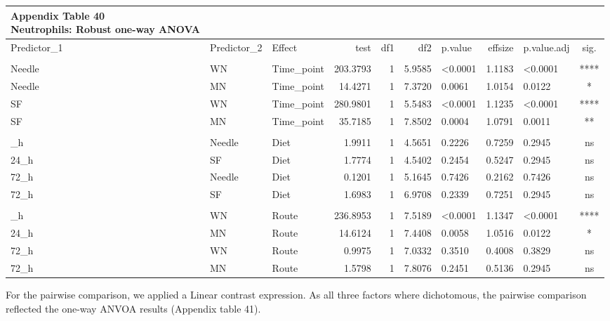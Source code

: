 \documentclass[
  12pt,
  letterpaper,
]{article}
\begin{document}
\begingroup
\fontsize{12.0pt}{14.4pt}\selectfont
\begin{longtable}{lllrrrlrlc}
\caption*{
{\large \textbf{Appendix Table 40}} \\ 
{\small \textbf{Neutrophils: Robust one-way ANOVA}}
} \\ 
\toprule
Predictor\_1 & Predictor\_2 & {Effect} & {test} & {df1} & {df2} & {p.value} & {effsize} & {p.value.adj} & {sig.} \\ 
\midrule\addlinespace[2.5pt]
\multicolumn{10}{l}{Predictor: Time\_point} \\[2.5pt] 
\midrule\addlinespace[2.5pt]
Needle & WN & Time\_point & 203.3793 & 1 & 5.9585 & <0.0001 & 1.1183 & <0.0001 & **** \\ 
Needle & MN & Time\_point & 14.4271 & 1 & 7.3720 & 0.0061 & 1.0154 & 0.0122 & * \\ 
SF & WN & Time\_point & 280.9801 & 1 & 5.5483 & <0.0001 & 1.1235 & <0.0001 & **** \\ 
SF & MN & Time\_point & 35.7185 & 1 & 7.8502 & 0.0004 & 1.0791 & 0.0011 & ** \\ 
\midrule\addlinespace[2.5pt]
\multicolumn{10}{l}{Predictor: Diet} \\[2.5pt] 
\midrule\addlinespace[2.5pt]
24\_h & Needle & Diet & 1.9911 & 1 & 4.5651 & 0.2226 & 0.7259 & 0.2945 & ns \\ 
24\_h & SF & Diet & 1.7774 & 1 & 4.5402 & 0.2454 & 0.5247 & 0.2945 & ns \\ 
72\_h & Needle & Diet & 0.1201 & 1 & 5.1645 & 0.7426 & 0.2162 & 0.7426 & ns \\ 
72\_h & SF & Diet & 1.6983 & 1 & 6.9708 & 0.2339 & 0.7251 & 0.2945 & ns \\ 
\midrule\addlinespace[2.5pt]
\multicolumn{10}{l}{Predictor: Route} \\[2.5pt] 
\midrule\addlinespace[2.5pt]
24\_h & WN & Route & 236.8953 & 1 & 7.5189 & <0.0001 & 1.1347 & <0.0001 & **** \\ 
24\_h & MN & Route & 14.6124 & 1 & 7.4408 & 0.0058 & 1.0516 & 0.0122 & * \\ 
72\_h & WN & Route & 0.9975 & 1 & 7.0332 & 0.3510 & 0.4008 & 0.3829 & ns \\ 
72\_h & MN & Route & 1.5798 & 1 & 7.8076 & 0.2451 & 0.5136 & 0.2945 & ns \\ 
\bottomrule
\end{longtable}
\endgroup

For the pairwise comparison, we applied a Linear contrast expression. As all three factors where dichotomous, the pairwise comparison reflected the one-way ANVOA results (Appendix table 41).
\end{document}

